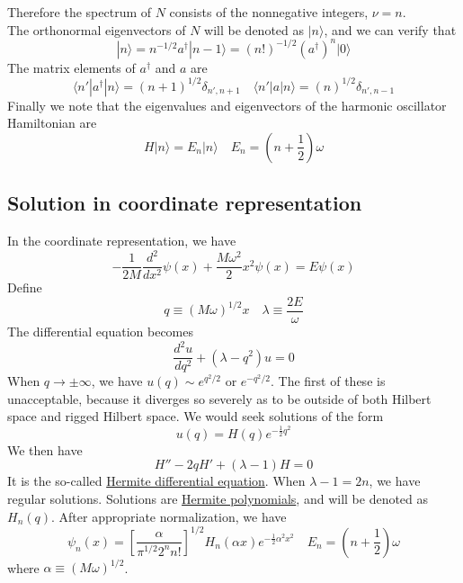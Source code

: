 \documentclass[cyan]{elegantnote}
\begin{document}
Therefore the spectrum of $N$ consists of the nonnegative integers, $\nu=n$. \\
The orthonormal eigenvectors of $N$ will be denoted as $|n\rangle$, and we can verify that
\[ |n\rangle = n^{-1/2} a^{\dagger} |n-1\rangle = (n!)^{-1/2} (a^{\dagger})^n |0\rangle\]
The matrix elements of $a^{\dagger}$ and $a$ are
\[\langle n' | a^{\dagger} |n \rangle = (n+1)^{1/2}\delta_{n',n+1} \quad  \langle n' | a |n \rangle = (n)^{1/2}\delta_{n',n-1}\]
Finally we note that the eigenvalues and eigenvectors of the harmonic oscillator Hamiltonian are
\[H |n\rangle = E_n |n\rangle \quad  E_n =(n+\frac{1}{2})\omega\]

\subsection{Solution in coordinate representation}
In the coordinate representation, we have
\[-\frac{1}{2M} \frac{d^2}{dx^2} \psi(x) + \frac{M\omega^2}{2}x^2 \psi(x) = E \psi(x)\]
Define
\[q \equiv (M\omega)^{1/2}x \quad \lambda \equiv \frac{2E}{\omega}\]
The differential equation becomes
\[\frac{d^2u}{dq^2} + (\lambda - q^2)u = 0\]
When $q \to \pm \infty$, we have $u(q) \sim e^{q^2/2}$ or $e^{-q^2/2}$. The first of these is unacceptable, because it
diverges so severely as to be outside of both Hilbert space and rigged Hilbert space. We would seek solutions of the form 
\[u(q) = H(q) e^{-\frac{1}{2}q^2}\]
We then have
\[H'' - 2qH' + (\lambda-1)H = 0\]
It is the so-called \href{http://mathworld.wolfram.com/HermiteDifferentialEquation.html}{Hermite differential equation}. When $\lambda - 1 = 2n$, we have regular solutions. Solutions are \href{http://mathworld.wolfram.com/HermitePolynomial.html}{Hermite polynomials}, and will be denoted as $H_n(q)$. After appropriate normalization, we have
\[\psi_n(x) = \left [ \frac{\alpha}{\pi^{1/2} 2^n n!} \right ]^{1/2} H_n(\alpha x) e^{-\frac{1}{2}\alpha^2 x^2} \quad E_n = (n+\frac{1}{2})\omega\]
where $\alpha \equiv (M\omega)^{1/2}$.
\end{document}
